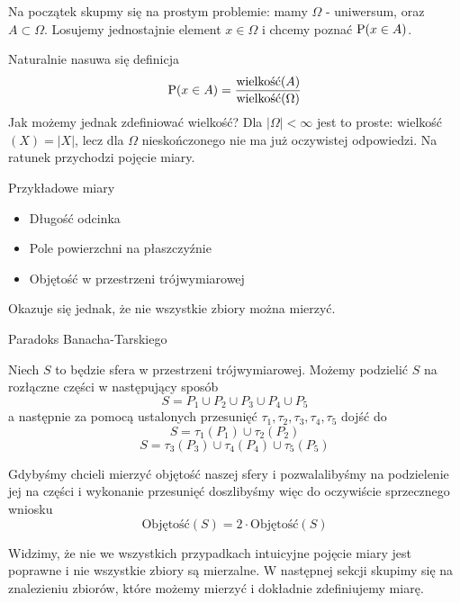 Na początek skupmy się na prostym problemie: mamy \(\Omega\) - uniwersum, oraz \(A \subset \Omega\). Losujemy jednostajnie element \(x \in \Omega\) i chcemy poznać \(\operatorname{P}(x \in A)\).

Naturalnie nasuwa się definicja
\[
	\operatorname{P}(x \in A) = \frac{\text{wielkość}(A)}{\text{wielkość}(\Omega)}
\]
Jak możemy jednak zdefiniować wielkość? Dla \(|\Omega| < \infty\) jest to proste: wielkość\((X) = |X|\), lecz dla \(\Omega\) nieskończonego nie ma już oczywistej odpowiedzi. Na ratunek przychodzi pojęcie miary.

\begin{example} Przykładowe miary
	\begin{itemize}
		\item Długość odcinka
		\item Pole powierzchni na płaszczyźnie
		\item Objętość w przestrzeni trójwymiarowej
	\end{itemize}
\end{example}

Okazuje się jednak, że nie wszystkie zbiory można mierzyć.
\begin{example}
	Paradoks Banacha-Tarskiego
	
	Niech \(S\) to będzie sfera w przestrzeni trójwymiarowej. Możemy podzielić \(S\) na rozłączne części w następujący sposób
	\[
		S = P_1 \cup P_2 \cup P_3 \cup P_4 \cup P_5
	\]
	a następnie za pomocą ustalonych przesunięć \(\tau_1, \tau_2, \tau_3, \tau_4, \tau_5\) dojść do
	\[
		S = \tau_1(P_1) \cup \tau_2(P_2)
	\]
	\[
		S = \tau_3(P_3) \cup \tau_4(P_4) \cup \tau_5(P_5)
	\]
	
	Gdybyśmy chcieli mierzyć objętość naszej sfery i pozwalalibyśmy na podzielenie jej na części i wykonanie przesunięć doszlibyśmy więc do oczywiście sprzecznego wniosku
	\[
		\text{Objętość}(S) = 2 \cdot \text{Objętość}(S) 
	\]
\end{example}

Widzimy, że nie we wszystkich przypadkach intuicyjne pojęcie miary jest poprawne i nie wszystkie zbiory są mierzalne. W następnej sekcji skupimy się na znalezieniu zbiorów, które możemy mierzyć i dokładnie zdefiniujemy miarę.